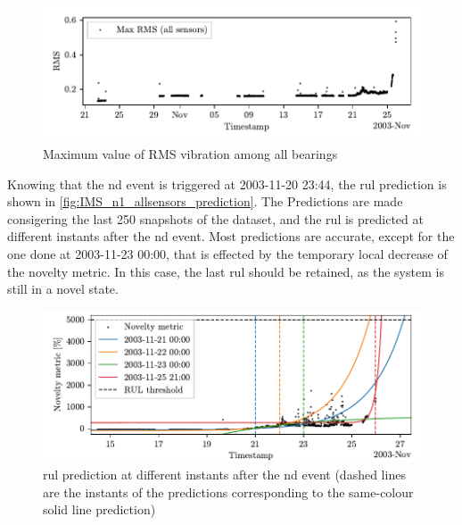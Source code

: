 \begin{figure}
    \centering
    \includegraphics{images/IMS/Novelty_01_RMS_allsensors.pdf}
    \caption{Maximum value of RMS vibration among all bearings}
    \label{fig:IMS_n1_allsensors_RMS}
\end{figure}

Knowing that the \gls{nd} event is triggered at 2003-11-20 23:44, the \gls{rul} prediction is shown in \autoref{fig:IMS_n1_allsensors_prediction}. The Predictions are made consigering the last 250 snapshots of the dataset, and the \gls{rul} is predicted at different instants after the \gls{nd} event. Most predictions are accurate, except for the one done at 2003-11-23 00:00, that is effected by the temporary local decrease of the novelty metric. In this case, the last \gls{rul} should be retained, as the system is still in a novel state.

\begin{figure}
    \centering
    \includegraphics[width=\textwidth]{images/IMS/Novelty_01_500samples_allsensors_predictions.pdf}
    \caption{\gls{rul} prediction at different instants after the \gls{nd} event (dashed lines are the instants of the predictions corresponding to the same-colour solid line prediction)}
    \label{fig:IMS_n1_allsensors_prediction}
\end{figure}
